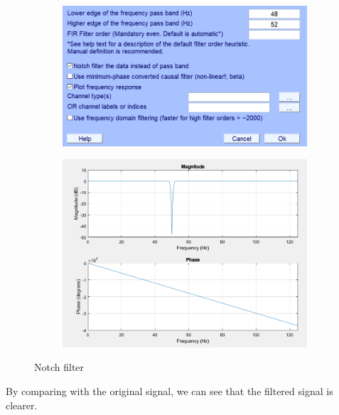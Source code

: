 \documentclass[hidelinks,12pt]{article}
\begin{document}
	\begin{figure}[!h]
		\centering
		\begin{subfigure}{0.45\textwidth}
			\centering
			\includegraphics[width=\linewidth]{5}
			\vspace{0.3cm}
		\end{subfigure}
		\hfill
		\begin{subfigure}{0.45\textwidth}
			\centering
			\includegraphics[width=\linewidth]{6}
		\end{subfigure}
		\caption{Notch filter}
	\end{figure}
	
	By comparing with the original signal, we can see that the filtered signal is clearer.
	
\end{document}
